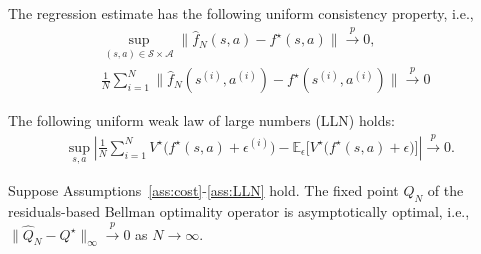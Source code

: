 \documentclass[10pt,a4paper]{amsart}
\begin{document}
\begin{assumption}\label{ass:regression estimate consistency}
The regression estimate has the following uniform consistency property, i.e., 
\begin{align}
    & \sup_{(s,a)\in\mathcal S\times\mathcal A}\|\hat f_N(s,a)-f^\star(s,a)\|\xrightarrow{p}0, \label{eq: part 1 in regression ass}\\
    & \frac{1}{N}\sum_{i=1}^N \|\hat{f}_N(s^{(i)},a^{(i)}) - f^\star(s^{(i)},a^{(i)})\| \xrightarrow{p} 0 \label{eq: part 2 in regression ass}
\end{align}
\end{assumption}

\begin{assumption}\label{ass:LLN}
The following uniform weak law of large numbers (LLN) holds:
\small
\begin{align}
\sup_{s,a}
\left|
\frac{1}{N}\sum_{i=1}^{N} V^\star\bigl(f^\star(s,a)+\epsilon^{(i)}\bigr)
-\mathbb E_{\epsilon}\bigl[V^\star\bigl(f^\star(s,a)+\epsilon\bigr)\bigr]
\right|
\xrightarrow{p} 0.
\end{align}
\normalsize
\end{assumption}

\begin{theorem}
\label{thm:consistency} Suppose Assumptions\ \ref{ass:cost}-\ref{ass:LLN} hold. The fixed point $\hat{Q}_N$ of the residuals-based Bellman optimality operator is asymptotically optimal, i.e., $\|\hat Q_N-Q^\star\|_\infty \xrightarrow{p} 0$ as $N\to\infty$.
\end{theorem}
\end{document}
